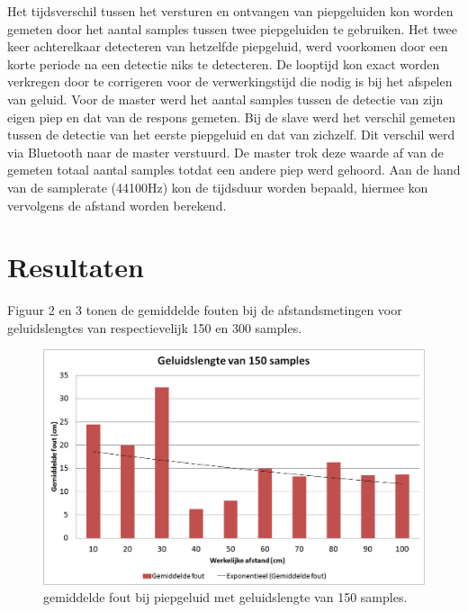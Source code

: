 \documentclass[12pt]{article}
\begin{document}
Het tijdsverschil tussen het versturen en ontvangen van piepgeluiden kon worden gemeten door het aantal samples tussen twee piepgeluiden te gebruiken. Het twee keer achterelkaar detecteren van hetzelfde piepgeluid, werd voorkomen door een korte periode na een detectie niks te detecteren. De looptijd kon exact worden verkregen door te corrigeren voor de verwerkingstijd die nodig is bij het afspelen van geluid. Voor de master werd het aantal samples tussen de detectie van zijn eigen piep en dat van de respons gemeten. Bij de slave werd het verschil gemeten tussen de detectie van het eerste piepgeluid en dat van zichzelf. Dit verschil werd via Bluetooth naar de master verstuurd. De master trok deze waarde af van de gemeten totaal aantal samples totdat een andere piep werd gehoord. Aan de hand van de samplerate (44100Hz) kon de tijdsduur worden bepaald, hiermee kon vervolgens de afstand worden berekend.

\section{Resultaten}
\label{sec:resultaten}
Figuur 2 en 3 tonen de gemiddelde fouten bij de afstandsmetingen voor geluidslengtes van respectievelijk 150 en 300 samples.
\begin{figure}[h!]
\centering
\includegraphics[scale=0.4]{150-samples}
\caption{gemiddelde fout bij piepgeluid met geluidslengte van 150 samples.}
\end{figure}
\end{document}
